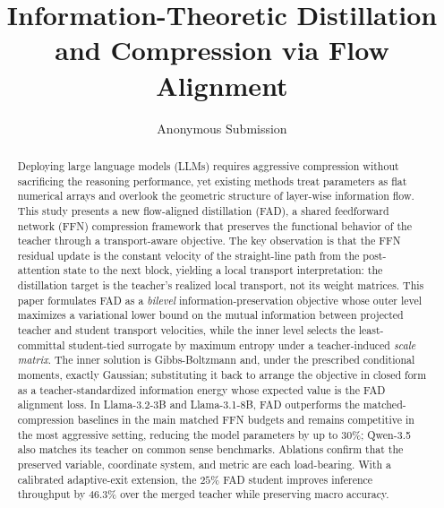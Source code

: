 \documentclass[letterpaper]{article} %
\title{Information-Theoretic Distillation and Compression via Flow Alignment}
\author{Anonymous Submission}
\theoremstyle{plain}
\theoremstyle{definition}
\begin{document}
\maketitle

\begin{abstract}
Deploying large language models (LLMs) requires aggressive compression without sacrificing the reasoning performance, yet existing methods treat parameters as flat numerical arrays and overlook the geometric structure of layer-wise information flow. This study presents a new {flow-aligned distillation (FAD)}, a shared feedforward network (FFN) compression framework that preserves the functional behavior of the teacher through a transport-aware objective. The key observation is that the FFN residual update is the constant velocity of the straight-line path from the post-attention state to the next block, yielding a local transport interpretation: the distillation target is the teacher's realized local transport, not its weight matrices. This paper formulates FAD as a \emph{bilevel} information-preservation objective whose outer level maximizes a variational lower bound on the mutual information between projected teacher and student transport velocities, while the inner level selects the least-committal student-tied surrogate by maximum entropy under a teacher-induced \emph{scale matrix}. The inner solution is Gibbs-Boltzmann and, under the prescribed conditional moments, exactly Gaussian; substituting it back to arrange the objective in closed form as a teacher-standardized information energy whose expected value is the FAD alignment loss. In Llama-3.2-3B and Llama-3.1-8B, FAD outperforms the matched-compression baselines in the main matched FFN budgets and remains competitive in the most aggressive setting, reducing the model parameters by up to $30\%$; Qwen-3.5 also matches its teacher on common sense benchmarks. Ablations confirm that the preserved variable, coordinate system, and metric are each load-bearing. With a calibrated adaptive-exit extension, the $25\%$ FAD student improves inference throughput by 46.3\% over the merged teacher while preserving macro accuracy.
\end{abstract}
\end{document}
